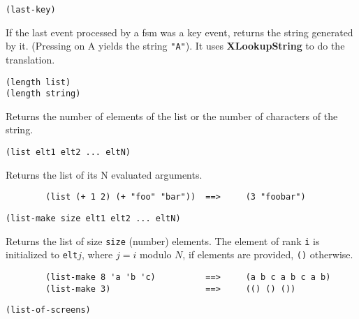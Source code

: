         
{\usagefont\begin{verbatim}
(last-key)
\end{verbatim}}\usageupspace

If the last event processed by a fsm was a key event, returns the string
generated by it. (Pressing on A yields the string \verb|"A"|). It uses 
{\bf XLookupString} to do the translation.

        
{\usagefont\begin{verbatim}
(length list)
(length string)
\end{verbatim}}\usageupspace

Returns the number of elements of the list or the number of
characters of the string.

        
{\usagefont\begin{verbatim}
(list elt1 elt2 ... eltN)
\end{verbatim}}\usageupspace

Returns the list of its N evaluated arguments.

{\exemplefont\begin{verbatim}
        (list (+ 1 2) (+ "foo" "bar"))  ==>     (3 "foobar")
\end{verbatim}}


{\usagefont\begin{verbatim}
(list-make size elt1 elt2 ... eltN)
\end{verbatim}}\usageupspace

Returns the list of size \verb"size" (number) elements. The element of rank
\verb"i" is initialized to \verb"elt"$j$, where $j = i$ modulo $N$, if
elements are provided, \verb"()" otherwise.

{\exemplefont\begin{verbatim}
        (list-make 8 'a 'b 'c)          ==>     (a b c a b c a b)
        (list-make 3)                   ==>     (() () ())
\end{verbatim}}


{\usagefont\begin{verbatim}
(list-of-screens)
\end{verbatim}}\usageupspace


